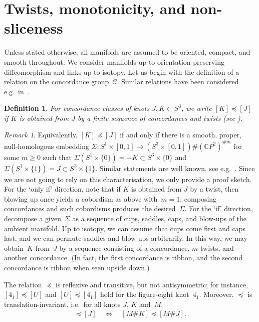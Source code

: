 \documentclass{amsart}
\newtheorem{definition}[theorem]{Definition}
\theoremstyle{remark}
\newtheorem{remark}[theorem]{Remark}
\begin{document}
\section{Twists, monotonicity, and non-sliceness}\label{sec:twists}

Unless stated otherwise, all manifolds are assumed to be oriented, compact, and smooth throughout. We consider manifolds up to orientation-preserving diffeomorphism and links up to isotopy. Let us begin with the definition of a relation on the concordance group~$\mathcal{C}$.
Similar relations have been considered e.g.~in~\cite{zbMATH04096384,zbMATH06198082,zbMATH06339370}.

\begin{definition}
For concordance classes of knots $J, K\subset S^3$, we write $[K] \preceq [J]$ if $K$ is obtained from $J$ by a finite sequence of concordances and twists (see ).
\end{definition}

\begin{remark}
Equivalently, $[K] \preceq [J]$ if and only if there is a smooth, proper, null-homologous embedding $\Sigma\colon S^1\times [0,1] \to (S^3 \times [0,1]) \# (\mathbb{C}P^2)^{\#m}$ for some $m \geq 0$ such that $\Sigma(S^1\times\{0\}) = -K \subset S^3 \times \{0\}$ 
and $\Sigma(S^1\times\{1\}) = J \subset S^3 \times \{1\}$. Similar statements are well known, see e.g.~\cite[Theorem~5.7]{zbMATH06339370}. Since we are not going to rely on this characterisation, we only provide a proof sketch. For the `only if' direction, note that if $K$ is obtained from $J$ by a twist, then blowing up once yields a cobordism as above with~$m = 1$; composing concordances and such cobordisms produces the desired~$\Sigma$. For the `if' direction, decompose a given~$\Sigma$ as a sequence of cups, saddles, caps, and blow-ups of the ambient manifold. Up to isotopy, we can assume that cups come first and caps last, and we can permute saddles and blow-ups arbitrarily. In this way, we may obtain~$K$ from~$J$ by a sequence consisting of a concordance, $m$ twists, and another concordance. (In fact, the first concordance is ribbon, and the second concordance is ribbon when seen upside down.)
\end{remark}

The relation $\preceq$ is reflexive and transitive, but not antisymmetric; for instance, $[4_1] \preceq [U]$ and $[U] \preceq [4_1]$ hold for the figure-eight knot~$4_1$. Moreover, $\preceq$ is translation-invariant, i.e.~for all knots $J$, $K$  and~$M$,
\begin{align*}
    [K] \preceq [J] \quad \Leftrightarrow \quad
[M\#K] \preceq [M\#J].
\end{align*}
\end{document}
